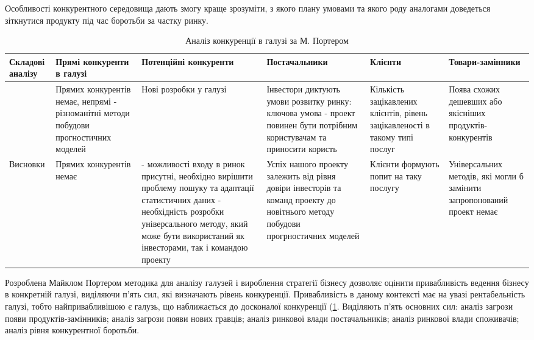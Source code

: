 Особливості конкурентного середовища дають змогу краще зрозуміти, з якого плану умовами та якого роду аналогами доведеться зіткнутися продукту під час боротьби за частку ринку.

\begin{table}[h!]
\fontsize{12pt}{12pt}\selectfont
	\begin{tabularx}{\textwidth}{|X|X|X|X|X|X|}
    \hline
    Складові аналізу & Прямі конкуренти в галузі & Потенційні конкуренти & Постачальники & Клієнти & Товари-замінники \\ \hline
     & Прямих конкурентів немає, непрямі - різноманітні методи побудови прогностичних моделей & Нові розробки у галузі & Інвестори диктують умови розвитку ринку: ключова умова - проект повинен бути потрібним користувачам та приносити користь & Кількість зацікавлених клієнтів, рівень зацікавленості в такому типі послуг & Поява схожих дешевших або якісніших продуктів-конкурентів \\ \hline
    Висновки & Прямих конкурентів немає & - можливості входу в ринок присутні, необхідно вирішити проблему пошуку та адаптації статистичних даних - необхідність розробки універсального методу, який може бути використаний як інвесторами, так і командою проекту & Успіх нашого проекту залежить від рівня довіри інвесторів та команд проекту до новітнього методу побудови прогрностичних моделей & Клієнти формують попит на таку послугу & Універсальних методів, які могли б замінити запропонований проект немає \\
    \hline
    \end{tabularx}
\caption{Аналіз конкуренції в галузі за М. Портером} \label{tab:stab_5}
\end{table}

Розроблена Майклом Портером методика для аналізу галузей і вироблення стратегії бізнесу дозволяє оцінити привабливість ведення бізнесу в конкретній галузі, виділяючи п'ять сил, які визначають рівень конкуренції. Привабливість в даному контексті має на увазі рентабельність галузі, тобто найпривабливішою є галузь, що наближається до досконалої конкуренції (\ref{tab:stab_5}. Виділяють п'ять основних сил: аналіз загрози появи продуктів-замінників; аналіз загрози появи нових гравців; аналіз ринкової влади постачальників; аналіз ринкової влади споживачів; аналіз рівня конкурентної боротьби.

